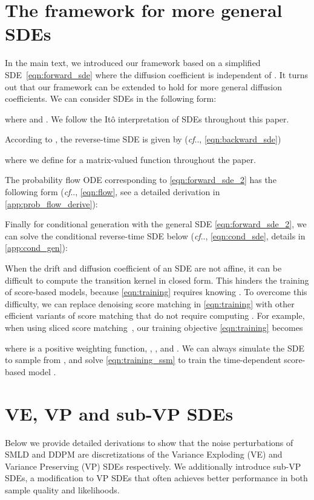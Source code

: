 \documentclass{article} \usepackage{iclr2021_conference,times}
\makeatletter
\def\@onedot{\ifx\@let@token.\else.\null\fi\xspace}
\DeclareRobustCommand\onedot{\futurelet\@let@token\@onedot}
\def\cf{\emph{cf}\onedot}
\makeatother
\begin{document}
\section{The framework for more general SDEs}\label{app:general_sde}
In the main text, we introduced our framework based on a simplified SDE~\cref{eqn:forward_sde} where the diffusion coefficient is independent of . It turns out that our framework can be extended to hold for more general diffusion coefficients. We can consider SDEs in the following form:

where  and . We follow the It\^{o} interpretation of SDEs throughout this paper.

According to \citep{Anderson1982-ny}, the reverse-time SDE is given by (\cf, \cref{eqn:backward_sde})

where we define  for a matrix-valued function  throughout the paper. 

The probability flow ODE corresponding to \cref{eqn:forward_sde_2} has the following form (\cf, \cref{eqn:flow}, see a detailed derivation in \cref{app:prob_flow_derive}):

Finally for conditional generation with the general SDE \cref{eqn:forward_sde_2}, we can solve the conditional reverse-time SDE below (\cf, \cref{eqn:cond_sde}, details in \cref{app:cond_gen}):


When the drift and diffusion coefficient of an SDE are not affine, it can be difficult to compute the transition kernel  in closed form. This hinders the training of score-based models, because \cref{eqn:training} requires knowing . To overcome this difficulty, we can replace denoising score matching in \cref{eqn:training} with other efficient variants of score matching that do not require computing . For example, when using sliced score matching~\citep{song2019sliced}, our training objective \cref{eqn:training} becomes

where  is a positive weighting function, , , and . We can always simulate the SDE to sample from , and solve \cref{eqn:training_ssm} to train the time-dependent score-based model .




\section{VE, VP and sub-VP SDEs}\label{app:sde_derive}
Below we provide detailed derivations to show that the noise perturbations of SMLD and DDPM are discretizations of the Variance Exploding (VE) and Variance Preserving (VP) SDEs respectively. We additionally introduce sub-VP SDEs, a modification to VP SDEs that often achieves better performance in both sample quality and likelihoods.
\end{document}

